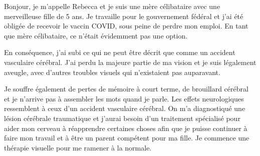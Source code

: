 Bonjour, je m'appelle Rebecca et je suis une mère célibataire avec une
merveilleuse fille de 5 ans. Je travaille pour le gouvernement fédéral et j'ai
été obligée de recevoir le vaccin COVID, sous peine de perdre mon emploi. En
tant que mère célibataire, ce n'était évidemment pas une option.

En conséquence, j'ai subi ce qui ne peut être décrit que comme un accident
vasculaire cérébral. J'ai perdu la majeure partie de ma vision et je suis
légalement aveugle, avec d'autres troubles visuels qui n'existaient pas
auparavant.

Je souffre également de pertes de mémoire à court terme, de brouillard cérébral
et je n'arrive pas à assembler les mots quand je parle. Les effets neurologiques
ressemblent à ceux d'un accident vasculaire cérébral. On m'a diagnostiqué une
lésion cérébrale traumatique et j'aurai besoin d'un traitement spécialisé pour
aider mon cerveau à réapprendre certaines choses afin que je puisse continuer à
faire mon travail et à être un parent compétent pour ma fille. Je commence une
thérapie visuelle pour me ramener à la normale.
